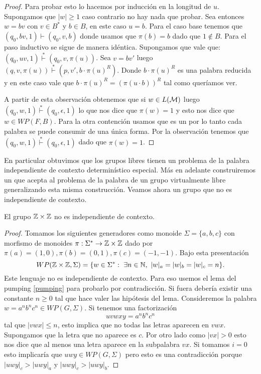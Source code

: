 \documentclass[tesis.tex]{subfiles}
\begin{document}
\begin{proof}
	Para probar esto lo hacemos por inducción en la longitud de $u$.
	Supongamos que $|w| \ge 1$ caso contrario no hay nada que probar.
	Sea entonces $w = bv$ con $v \in B^*$ y $b \in B$, en este caso $u = b$.
	Para el caso base tenemos que $(q_{0},bv,1) \vdash (q_{0},v,b)$ donde usamos que $\pi(b) = b$ dado que $1 \notin B$.
	Para el paso inductivo se sigue de manera idéntica.
	Supongamos que vale que: \newline			
	$(q_{0},uv,1) \overset{*}{\vdash} (q_{0}, v, \pi(u))$.
	Sea $v=bv'$ luego $(q,v,\pi(u)) \overset{*}{\vdash} (p,v',b \cdot \pi(u)^R)$.
	Donde $b \cdot \pi(u)^R$ es una palabra reducida y en este caso vale que $b \cdot \pi(u)^R = (\pi(u \cdot b))^R$ tal como queríamos ver.
	
	
	A partir de esta observación obtenemos que si $w \in L(\cal M)$ luego 
	$(q_{0},w,1) \overset{*}{\vdash} (q_{0},\epsilon,1)$ lo que nos dice que $\pi(w) = 1$ y esto nos dice que $w \in WP(F, B)$.
	Para la otra contención usamos que es un \APD por lo tanto cada palabra se puede consumir de una única forma.
	Por la observación tenemos que $(q_{0},w,1) \overset{*}{\vdash} (q_{0},\epsilon,1)$ dado que $\pi(w) = 1$.
\end{proof}

En particular obtuvimos que los grupos libres tienen un problema de la palabra independiente de contexto determinístico especial.
Más en adelante construiremos un \APD que acepta al problema de la palabra de un grupo virtualmente libre generalizando esta misma construcción.
Veamos ahora un grupo que no es independiente de contexto.

\begin{prop}
	El grupo $\mathbb{Z} \times \mathbb{Z}$ no es independiente de contexto.
\end{prop}

\begin{proof}
	Tomamos los siguientes generadores como monoide $\Sigma = \{ a,b,c \}$ con morfismo de monoides $\pi: \Sigma^* \to \mathbb{Z} \times \mathbb{Z}$ dado por $\pi(a)=(1,0), \pi(b)=(0,1), \pi(c)=(-1,-1)$.
	Bajo esta presentación 
	\[
	WP(\mathbb{Z} \times \mathbb{Z}, \Sigma) = \{ w \in \Sigma^*  : \ \exists n \in \mathbb{N}, \ |w|_a = |w|_b = |w|_c = n \}.
	\]
	Este lenguaje no es independiente de contexto.
	Para eso usemos el lema del pumping \ref{pumping} para probarlo por contradicción.
	Si fuera \ic debería existir una constante $n \ge 0$ tal que hace valer las hipótesis del lema.
	Consideremos la palabra $w = a^n b^n c^n \in WP(G, \Sigma)$.
	Si tenemos una factorización 
	\[
	uvwxy = a^nb^nc^n
	\]
	tal que $|vwx| \le n$, esto implica que no todas las letras aparecen en $vwx$.
	Supongamos que la letra que no aparece es $c$.
	Por otro lado como $|vx| > 0$ esto nos dice que al menos una letra aparece en la subpalabra $vx$.
	Si tomamos $i=0$ esto implicaría que $uwy \in WP(G,\Sigma)$ pero esto es una contradicción porque $|uwy|_{c} > |uwy|_{a}$ y $|uwy|_{c} > |uwy|_{b}$.
\end{proof}
 
\end{document}
